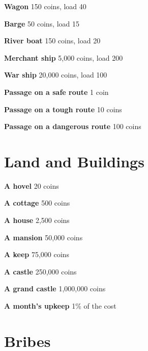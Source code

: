 {\noindent \bfseries Wagon} \hspace*{\fill} 150 coins, load 40

{\noindent \bfseries Barge} \hspace*{\fill} 50 coins, load 15

{\noindent \bfseries River boat} \hspace*{\fill} 150 coins, load 20

{\noindent \bfseries Merchant ship} \hspace*{\fill} 5,000 coins, load 200

{\noindent \bfseries War ship} \hspace*{\fill} 20,000 coins, load 100

{\noindent \bfseries Passage on a safe route} \hspace*{\fill} 1 coin

{\noindent \bfseries Passage on a tough route} \hspace*{\fill} 10 coins

{\noindent \bfseries Passage on a dangerous route} \hspace*{\fill} 100 coins
\section*{Land and Buildings}

{\noindent \bfseries A hovel} \hspace*{\fill} 20 coins

{\noindent \bfseries A cottage} \hspace*{\fill} 500 coins

{\noindent \bfseries A house} \hspace*{\fill} 2,500 coins

{\noindent \bfseries A mansion} \hspace*{\fill} 50,000 coins

{\noindent \bfseries A keep} \hspace*{\fill} 75,000 coins

{\noindent \bfseries A castle} \hspace*{\fill} 250,000 coins

{\noindent \bfseries A grand castle} \hspace*{\fill} 1,000,000 coins

{\noindent \bfseries A month's upkeep} \hspace*{\fill} 1\% of the cost
\section*{Bribes}

